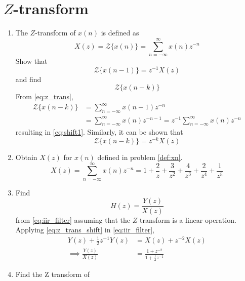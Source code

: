 \documentclass[journal,12pt,twocolumn]{IEEEtran}
\renewcommand\thesection{\arabic{section}}
\begin{document}
\section{$Z$-transform}
\begin{enumerate}[label=\thesection.\arabic*]
\item The $Z$-transform of $x(n)$ is defined as
%
\begin{equation}
\label{eq:z_trans}
X(z)={\mathcal {Z}}\{x(n)\}=\sum _{n=-\infty }^{\infty }x(n)z^{-n}
\end{equation}
%
Show that
\begin{equation}
\label{eq:shift1}
{\mathcal {Z}}\{x(n-1)\} = z^{-1}X(z)
\end{equation}
and find
\begin{equation}
	{\mathcal {Z}}\{x(n-k)\} 
\end{equation}
\solution From \eqref{eq:z_trans},
\begin{align}
{\mathcal {Z}}\{x(n-k)\} &=\sum _{n=-\infty }^{\infty }x(n-1)z^{-n}
\\
&=\sum _{n=-\infty }^{\infty }x(n)z^{-n-1} = z^{-1}\sum _{n=-\infty }^{\infty }x(n)z^{-n}
\end{align}
resulting in \eqref{eq:shift1}. Similarly, it can be shown that
%
\begin{equation}
\label{eq:z_trans_shift}
	{\mathcal {Z}}\{x(n-k)\} = z^{-k}X(z)
\end{equation}
\item Obtain $X(z)$ for $x(n)$ defined in problem 
	\ref{def:xn}.
\solution 
\begin{equation}
	X(z)=\sum _{n=-\infty }^{\infty }x(n)z^{-n}
	= 1 + \frac{2}{z} +\frac{3}{z^2} + \frac{4}{z^3} + \frac{2}{z^4} + \frac{1}{z^5}
\end{equation}
\item Find
%
\begin{equation}
H(z) = \frac{Y(z)}{X(z)}
\end{equation}
%
from  \eqref{eq:iir_filter} assuming that the $Z$-transform is a linear operation.
\\
\solution  Applying \eqref{eq:z_trans_shift} in \eqref{eq:iir_filter},
\begin{align}
Y(z) + \frac{1}{2}z^{-1}Y(z) &= X(z)+z^{-2}X(z)
\\
\implies \frac{Y(z)}{X(z)} &= \frac{1 + z^{-2}}{1 + \frac{1}{2}z^{-1}}
\label{eq:freq_resp}
\end{align}
%
\item Find the Z transform of 
\begin{equation}

\end{equation}
\end{enumerate}
\end{document}
